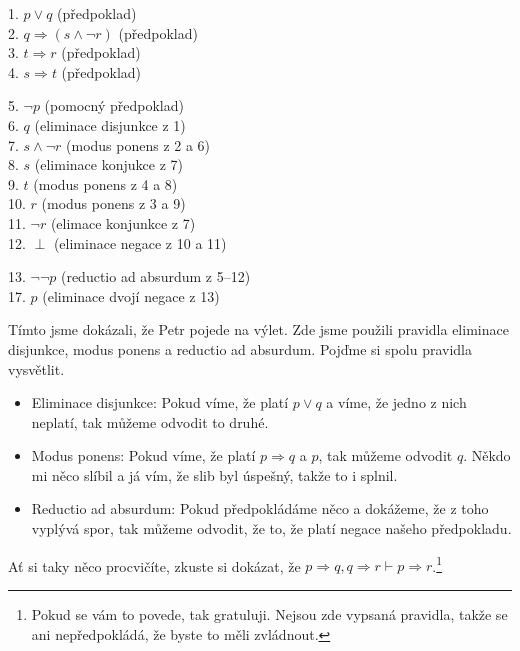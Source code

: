 \begin{example}
  \begin{proofbox}
    1. $p \lor q$ (předpoklad) \\
    2. $q \Rightarrow (s \land \neg r)$ (předpoklad) \\
    3. $t \Rightarrow r$ (předpoklad) \\
    4. $s \Rightarrow t$ (předpoklad) 
  \begin{proofbox}
    5. $\neg p$ (pomocný předpoklad) \\
    6. $q$ (eliminace disjunkce z 1) \\
    7. $s \land \neg r$ (modus ponens z 2 a 6) \\
    8. $s$ (eliminace konjukce z 7) \\
    9. $t$ (modus ponens z 4 a 8) \\
    10. $r$ (modus ponens z 3 a 9) \\
    11. $\neg r$ (elimace konjunkce z 7) \\
    12. $\perp$ (eliminace negace z 10 a 11)
  \end{proofbox}
    13. $\lnot\lnot p$ (reductio ad absurdum z 5--12) \\
    17. $p$ (eliminace dvojí negace z 13)
  \end{proofbox}
  Tímto jsme dokázali, že Petr pojede na výlet. Zde jsme použili pravidla eliminace disjunkce, modus ponens a reductio ad absurdum. Pojďme si spolu pravidla vysvětlit. 
  \begin{itemize}
    \item Eliminace disjunkce: Pokud víme, že platí $p \lor q$ a víme, že jedno z nich neplatí, tak můžeme odvodit to druhé. 
    \item Modus ponens: Pokud víme, že platí $p \Rightarrow q$ a $p$, tak můžeme odvodit $q$. Někdo mi něco slíbil a já vím, že slib byl úspešný, takže to i splnil.
    \item Reductio ad absurdum: Pokud předpokládáme něco a dokážeme, že z toho vyplývá spor, tak můžeme odvodit, že to, že platí negace našeho předpokladu.
  \end{itemize}
\end{example}

\begin{problem}
  Ať si taky něco procvičíte, zkuste si dokázat, že $p \Rightarrow q, q \Rightarrow r \vdash p \Rightarrow r$.\footnote{Pokud se vám to povede, tak gratuluji. Nejsou zde vypsaná pravidla, takže se ani nepředpokládá, že byste to měli zvládnout.}
\end{problem}

